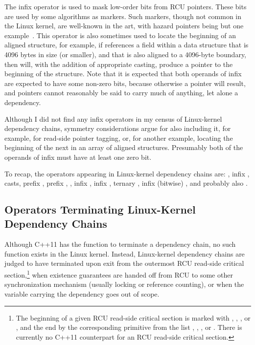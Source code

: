 \documentclass[letterpaper,twocolumn,10pt]{article}
\begin{document}
The infix \co{&} operator is used to mask low-order bits from RCU pointers.
These bits are used by some algorithms as markers.
Such markers, though not common in the Linux kernel, are well-known in
the art, with hazard pointers being but one example~\cite{MagedMichael04a}.
This operator is also sometimes used to locate the beginning of an
aligned structure, for example, if  references a field within a
data structure that is 4096 bytes in size (or smaller), and that is also
aligned to a 4096-byte boundary, then  will, with the
addition of appropriate casting, produce a pointer to the beginning of
the structure.
Note that it is expected that both operands of infix \co{&} are expected
to have some non-zero bits, because otherwise a  pointer will
result, and  pointers cannot
reasonably be said to carry much of anything, let alone a dependency.

Although I did not find any infix \co{|} operators in my census of
Linux-kernel dependency chains,
symmetry considerations argue for also including it, for example, for
read-side pointer tagging, or, for another example, locating the beginning
of the next in an array of aligned structures.
Presumably both of the operands of infix \co{|} must have at least one
zero bit.

To recap, the operators appearing in Linux-kernel dependency chains are:
\co{->}, infix \co{=}, casts, prefix \co{&}, prefix \co{*}, \co{[]},
infix \co{+}, infix \co{-}, ternary , infix (bitwise) \co{&},
and probably also \co{|}.

\subsection{Operators Terminating Linux-Kernel Dependency Chains}
\label{sec:Operators Terminating Linux-Kernel Dependency Chains}

Although C++11 has the  function to terminate
a dependency chain, no such function exists in the Linux kernel.
Instead, Linux-kernel dependency chains are judged to have terminated
upon exit from the outermost RCU read-side critical section,\footnote{
	The beginning of a given RCU read-side critical section is marked
	with , ,
	, or ,
	and the end by the corresponding primitive from the list
	, ,
	, or .
	There is currently no C++11 counterpart for an RCU read-side
	critical section.}
when existence guarantees are handed off from RCU to some other
synchronization mechanism (usually locking or reference counting),
or when the variable carrying the dependency goes out of scope.
\end{document}
